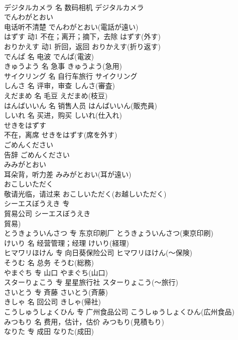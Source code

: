 \documentclass[8pt]{extreport}
\begin{document}
\begin{CJK}{UTF8}{min}
\\	デジタルカメラ	名	数码相机	デジタルカメラ	
\\	でんわがとおい	
\\	电话听不清楚	でんわがとおい(電話が遠い)	
\\	はずす	动1	不在；离开；摘下，去除	はずす(外す)	
\\	おりかえす	动1	折回，返回	おりかえす(折り返す)	
\\	でんぱ	名	电波	でんぱ(電波)	
\\	きゅうよう	名	急事	きゅうよう(急用)	
\\	サイクリング	名	自行车旅行	サイクリング	
\\	しんさ	名	评审，审查	しんさ(審査)	
\\	えだまめ	名	毛豆	えだまめ(枝豆)	
\\	はんばいいん	名	销售人员	はんばいいん(販売員)	
\\	しいれ	名	买进，购买	しいれ(仕入れ)	
\\	せきをはずす	
\\	不在，离席	せきをはずす(席を外す)	
\\	ごめんください	
\\	告辞	ごめんください	
\\	みみがとおい	
\\	耳朵背，听力差	みみがとおい(耳が遠い)	
\\	おこしいただく	
\\	敬请光临，请过来	おこしいただく(お越しいただく)	
\\	シーエスぼうえき	专	
\\	貿易公司	シーエスぼうえき
\\	貿易)	
\\	とうきょういんさつ	专	东京印刷厂	とうきょういんさつ(東京印刷)	
\\	けいり	名	经营管理；经理	けいり(経理)	
\\	ヒマワリほけん	专	向日葵保险公司	ヒマワリほけん(～保険)	
\\	そうむ	名	总务	そうむ(総務)	
\\	やまぐち	专	山口	やまぐち(山口)	
\\	スターりょこう	专	星星旅行社	スターりょこう(～旅行)	
\\	さいとう	专	斉藤	さいとう(斉藤)	
\\	きしゃ	名	回公司	きしゃ(帰社)	
\\	こうしゅうしょくひん	专	广州食品公司	こうしゅうしょくひん(広州食品)	
\\	みつもり	名	费用，估计，估价	みつもり(見積もり)	
\\	なりた	专	成田	なりた(成田)	

\end{CJK}
\end{document}
